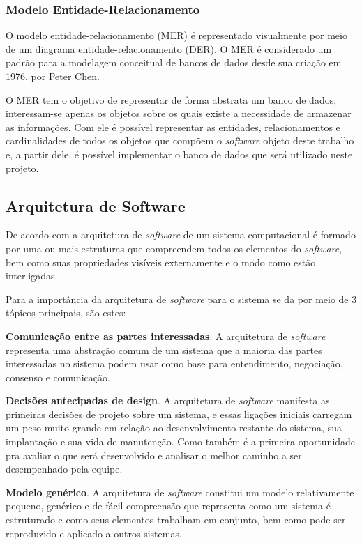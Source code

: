 \subsubsection{Modelo Entidade-Relacionamento}

O modelo entidade-relacionamento (MER) é representado visualmente por meio de um diagrama entidade-relacionamento (DER). O MER é considerado um padrão para a modelagem conceitual de bancos de dados desde sua criação em 1976, por Peter Chen.\cite{heuser}

O MER tem o objetivo de representar de forma abstrata um banco de dados, interessam-se apenas os objetos sobre os quais existe a necessidade de armazenar as informações. Com ele é possível representar as entidades, relacionamentos e cardinalidades de todos os objetos que compõem o \textit{software} objeto deste trabalho e, a partir dele, é possível implementar o banco de dados que será utilizado neste projeto.\cite{heuser}

\subsection{Arquitetura de Software}

De acordo com  a arquitetura de \textit{software} de um sistema computacional é formado por uma ou mais estruturas que compreendem todos os elementos do \textit{software}, bem como suas propriedades visíveis externamente e o modo como estão interligadas.

Para  a importância da arquitetura de \textit{software} para o sistema se da por meio de 3 tópicos principais, são estes:

\begin{lista}
\item \textbf{Comunicação entre as partes interessadas}. A arquitetura de \textit{software} representa uma abstração comum de um sistema que a maioria das partes interessadas no sistema podem usar como base para entendimento, negociação, consenso e comunicação.
\item \textbf{Decisões antecipadas de design}. A arquitetura de \textit{software} manifesta as primeiras decisões de projeto sobre um sistema, e essas ligações iniciais carregam um peso muito grande em relação ao desenvolvimento restante do sistema, sua implantação e sua vida de manutenção. Como também é a primeira oportunidade pra avaliar o que será desenvolvido e analisar o melhor caminho a ser desempenhado pela equipe.
\item \textbf{Modelo genérico}. A arquitetura de \textit{software} constitui um modelo relativamente pequeno, genérico e de fácil compreensão que representa como um sistema é estruturado e como seus elementos trabalham em conjunto, bem como pode ser reproduzido e aplicado a outros sistemas.
\end{lista}

